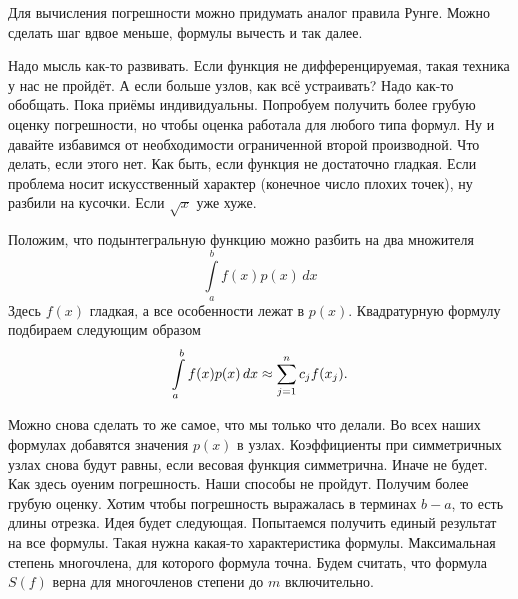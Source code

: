 Для вычисления погрешности можно придумать аналог правила Рунге. Можно сделать шаг вдвое меньше, формулы вычесть и так далее.

Надо мысль как-то развивать. Если функция не дифференцируемая, такая техника у нас не пройдёт. А если больше узлов, как всё устраивать? Надо как-то обобщать. Пока приёмы индивидуальны. Попробуем получить более грубую оценку погрешности, но чтобы оценка работала для любого типа формул. Ну и давайте избавимся от необходимости ограниченной второй производной. Что делать, если этого нет. Как быть, если функция не достаточно гладкая. Если проблема носит искусственный характер (конечное число плохих точек), ну разбили на кусочки. Если $\sqrt{x}$ уже хуже.

Положим, что подынтегральную функцию можно разбить на два множителя 
\[
  \int\limits_a^b f(x)p(x)\,dx
\]
Здесь $f(x)$ гладкая, а все особенности лежат в $p(x)$.  Квадратурную формулу подбираем следующим образом
\[
  \int\limits_a^b f(x)p(x)\,dx \approx \sum\limits_{j = 1}^{n} c_j f(x_j).
\]

Можно снова сделать то же самое, что мы только что делали. Во всех наших формулах добавятся значения $p(x)$ в узлах. Коэффициенты при симметричных узлах снова будут равны, если весовая функция симметрична. Иначе не будет. Как здесь оуеним погрешность. Наши способы не пройдут. Получим более грубую оценку. Хотим чтобы погрешность выражалась в терминах $b-a$, то есть длины отрезка. Идея будет следующая. Попытаемся получить единый результат на все формулы. Такая нужна какая-то характеристика формулы. Максимальная степень многочлена, для которого формула точна. Будем считать, что формула $S(f)$ верна для многочленов степени до $m$ включительно.

